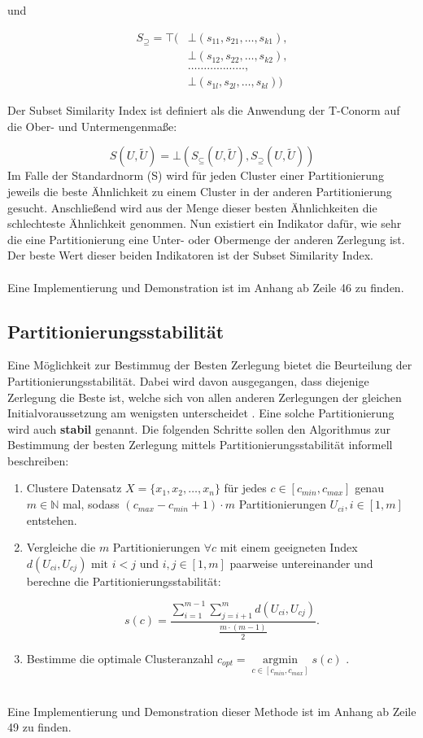 \documentclass[11pt,ceqn]{book}
\DeclareMathOperator*{\argmin}{argmin}
\begin{document}
und 


\begin{align*}
S_{\supseteq} = \top( 
&\bot(s_{11},s_{21}, \dots, s_{k1}), \\
&\bot(s_{12}, s_{22}, \dots, s_{k2}),\\ 
&\dots\dots\dots\dots\dots\dots,\\ 
&\bot(s_{1l}, s_{2l}, \dots, s_{kl})
)
\end{align*}

Der Subset Similarity Index ist definiert als die Anwendung der T-Conorm auf die Ober- und Untermengenmaße:

$$S(U,\tilde{U}) = \bot(S_{\subseteq}(U,\tilde{U}),S_{\supseteq}(U,\tilde{U}))$$
Im Falle der Standardnorm (S) wird für jeden Cluster einer Partitionierung jeweils die beste Ähnlichkeit zu einem Cluster in der anderen Partitionierung gesucht. Anschließend wird aus der Menge dieser besten Ähnlichkeiten die schlechteste Ähnlichkeit genommen. Nun existiert ein Indikator dafür, wie sehr die eine Partitionierung eine Unter- oder Obermenge der anderen Zerlegung ist. Der beste Wert dieser beiden Indikatoren ist der Subset Similarity Index.
\\~\\
Eine Implementierung und Demonstration ist im Anhang ab Zeile 46 zu finden.

\subsection{Partitionierungsstabilität}

Eine Möglichkeit zur Bestimmug der Besten Zerlegung bietet die Beurteilung der Partitionierungsstabilität. Dabei wird davon ausgegangen, dass diejenige Zerlegung die Beste ist, welche sich von allen anderen Zerlegungen der gleichen Initialvoraussetzung am wenigsten unterscheidet \cite{partstab}. Eine solche Partitionierung wird auch \textbf{stabil} genannt. Die folgenden Schritte sollen den Algorithmus zur Bestimmung der besten Zerlegung mittels Partitionierungsstabilität informell beschreiben:

\begin{enumerate}
\item Clustere Datensatz $X=\{x_1, x_2, \dots, x_n\}$ für jedes $c \in \left[c_{min},c_{max}\right]$ genau $m \in \mathbb{N}$ mal, sodass $(c_{max}-c_{min}+1)\cdot m$ Partitionierungen $U_{ci}, i\in \left[1,m\right]$ entstehen.
\item Vergleiche die $m$ Partitionierungen $\forall c$ mit einem geeigneten Index $d(U_{ci},U_{cj}) \text{ mit } i<j \text{ und } i,j \in \left[1,m\right]$ paarweise untereinander und berechne die Partitionierungsstabilität:

$$s(c)=\frac{\sum\limits_{i=1}^{m-1}\sum\limits_{j=i+1}^m d(U_{ci},U_{cj})}{\frac{m \cdot (m-1)}{2}}.$$
\item Bestimme die optimale Clusteranzahl $c_{opt} = \argmin \limits_{c\in \left[c_{min},c_{max}\right]} s(c)$ .
\end{enumerate}
~\\
Eine Implementierung und Demonstration dieser Methode ist im Anhang ab Zeile 49 zu finden.
\end{document}

